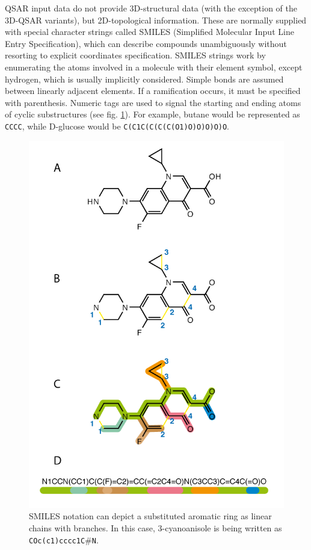 QSAR input data do not provide 3D-structural data (with the exception of the 3D-QSAR variants), but 2D-topological information. These are normally supplied with special character strings called SMILES (Simplified Molecular Input Line Entry Specification),\cite{smiles} which can describe compounds unambiguously without resorting to explicit coordinates specification. SMILES strings work by enumerating the atoms involved in a molecule with their element symbol, except hydrogen, which is usually implicitly considered. Simple bonds are assumed between linearly adjacent elements. If a ramification occurs, it must be specified with parenthesis. Numeric tags are used to signal the starting and ending atoms of cyclic substructures (see fig. \ref{fig:smiles}). For example, butane would be represented as \texttt{CCCC}, while D-glucose would be \texttt{C(C1C(C(C(C(O1)O)O)O)O)O}.


\begin{figure}[H]
	\begin{center}
	\includegraphics[height=0.9\textheight]{./figures/02/smiles.png}
	\end{center}
	\cprotect\caption[SMILES notation]{SMILES notation can depict a substituted aromatic ring as linear chains with branches. In this case, 3-cyanoanisole is being written as \texttt{COc(c1)cccc1C$\# $N}.}
	\label{fig:smiles}
\end{figure}

